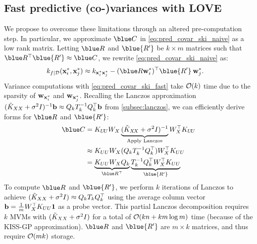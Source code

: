 \subsection{Fast predictive (co-)variances with LOVE{}}
We propose to overcome these limitations through an altered pre-computation step.
In particular, we approximate $\blue C$ in \eqref{eq:pred_covar_ski_naive} as a low rank matrix.
Letting $\blue R$ and $\blue{R'}$ be $k \times m$ matrices such that $\blue R^\top \blue{R'} \approx \blue C$, we rewrite \eqref{eq:pred_covar_ski_naive} as:
%
\begin{align}
  k_{f\mid\dset}(\bxtest_i, \bxtest_j) &\approx k_{\bxtest_i \bxtest_j} - (\blue R\bw^{*}_i )^{\top}\blue{R'} \: \bw^{*}_j.
    \label{eq:pred_covar_ski_fast}
\end{align}
%
Variance computations with \eqref{eq:pred_covar_ski_fast} take $\bigo{k}$ time
due to the sparsity of $\mathbf{w}_{\mathbf{x}^*_i}$ and $\mathbf{w}_{\mathbf{x}^*_j}$.
Recalling the Lanczos approximation
$
    (\tilde{K}_{XX} + \sigma^2 I)^{-1}\mathbf{b} \approx Q_{k}T^{-1}_{k}Q_{k}^{\top}\mathbf{b}
$
from \autoref{subsec:lanczos}, we can efficiently derive forms for $\blue R$ and $\blue{R'}$:
\begin{align*}
  \blue C &= \bK_{U \! U} W_{\bX} \underbrace{(\tilde{K}_{\bX\!\bX} + \sigma^2 \bI)^{-1}}_{\text{Apply Lanczos}} W^\top_{\bX} \bK_{U \! U} \\
         &\approx \bK_{UU} W_X (Q_k T_k^{-1} Q_k^\top) W_X^\top K_{UU} \\
         &= \underbrace{K_{UU} W_X Q_k}_{\blue R^\top} \underbrace{T_k^{-1} Q_k^\top W_X^\top \bK_{UU}}_{\blue{R'}}
\end{align*}
To compute $\blue R$ and $\blue{R'}$, we perform $k$ iterations of Lanczos to achieve $(\tilde{K}_{XX} + \sigma^2I)  \approx Q_{k}T_{k}Q_{k}^{\top}$ using the average column vector $\mathbf{b}=\frac{1}{m}W_X^\top K_{UU}\mathbf{1}$ as a probe vector.
This partial Lanczos decomposition requires $k$ MVMs with $(\tilde {K}_{XX} + \sigma^2 I)$ for a total of $\bigo{k n + k m \log m}$ time (because of the KISS-GP approximation).
$\blue R$ and $\blue{R'}$ are $m \times k$ matrices, and thus require $\bigo{mk}$ storage.

